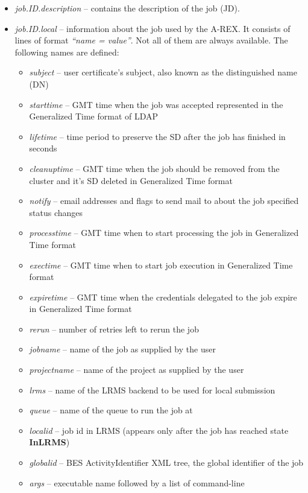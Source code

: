 \documentclass{article}                            %
\begin{document}
\begin{itemize}
\item \textit{job.ID.description} -- contains the description of the job
(JD).
\item \textit{job.ID.local} -- information about the job used by the A-REX.
It consists of lines of format \textit{{}``name = value''}. Not
all of them are always available. The following names are defined:

\begin{itemize}
\item \textit{subject} -- user certificate's subject, also known as the distinguished
name (DN)
\item \textit{starttime} -- GMT time when the job was accepted represented
in the Generalized Time format of LDAP 
\item \textit{lifetime} -- time period to preserve the SD after the job has
finished in seconds
\item \textit{cleanuptime} -- GMT time when the job should be removed from
the cluster and it's SD deleted in Generalized Time format
\item \textit{notify} -- email addresses and flags to send mail to about
the job specified status changes
\item \textit{processtime} -- GMT time when to start processing the job in
Generalized Time format
\item \textit{exectime} -- GMT time when to start job execution in Generalized
Time format
\item \textit{expiretime} -- GMT time when the credentials delegated to the
job expire in Generalized Time format
\item \textit{rerun} -- number of retries left to rerun the job
\item \textit{jobname} -- name of the job as supplied by the user
\item \textit{projectname} -- name of the project as supplied by the user
\item \textit{lrms} -- name of the LRMS backend to be used for local submission
\item \textit{queue} -- name of the queue to run the job at
\item \textit{localid} -- job id in LRMS (appears only after the job has
reached state \textbf{InLRMS})
\item \textit{globalid} -- BES ActivityIdentifier XML tree, the global
identifier of the job
\item \textit{args} -- executable name followed by a list of command-line

\end{itemize}
\end{itemize}
\end{document}
